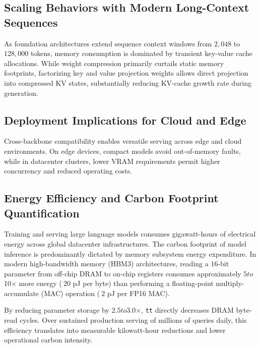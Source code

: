 \subsection{Scaling Behaviors with Modern Long-Context Sequences}
As foundation architectures extend sequence context windows from $2{,}048$ to $128{,}000$ tokens, memory consumption is dominated by transient key-value cache allocations. While weight compression primarily curtails static memory footprints, factorizing key and value projection weights allows direct projection into compressed KV states, substantially reducing KV-cache growth rate during generation.

\subsection{Deployment Implications for Cloud and Edge}
Cross-backbone compatibility enables versatile serving across edge and cloud environments. On edge devices, compact models avoid out-of-memory faults, while in datacenter clusters, lower VRAM requirements permit higher concurrency and reduced operating costs.

\subsection{Energy Efficiency and Carbon Footprint Quantification}
Training and serving large language models consumes gigawatt-hours of electrical energy across global datacenter infrastructures. The carbon footprint of model inference is predominantly dictated by memory subsystem energy expenditure. In modern high-bandwidth memory (HBM3) architectures, reading a 16-bit parameter from off-chip DRAM to on-chip registers consumes approximately $5$\times$ to $10$\times$ more energy ($~20$ pJ per byte) than performing a floating-point multiply-accumulate (MAC) operation ($~2$ pJ per FP16 MAC).

By reducing parameter storage by $2.5$\times$ to $3.0$\times$, \texttt{tt} directly decreases DRAM byte-read cycles. Over sustained production serving of millions of queries daily, this efficiency translates into measurable kilowatt-hour reductions and lower operational carbon intensity.
